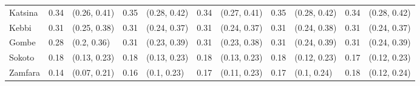 \begin{tabular}{lrlrlrlrlrl}
Katsina & 0.34 & (0.26, 0.41) & 0.35 & (0.28, 0.42) & 0.34 & (0.27, 0.41) & 0.35 & (0.28, 0.42) & 0.34 & (0.28, 0.42)\\
Kebbi & 0.31 & (0.25, 0.38) & 0.31 & (0.24, 0.37) & 0.31 & (0.24, 0.37) & 0.31 & (0.24, 0.38) & 0.31 & (0.24, 0.37)\\
Gombe & 0.28 & (0.2, 0.36) & 0.31 & (0.23, 0.39) & 0.31 & (0.23, 0.38) & 0.31 & (0.24, 0.39) & 0.31 & (0.24, 0.39)\\
Sokoto & 0.18 & (0.13, 0.23) & 0.18 & (0.13, 0.23) & 0.18 & (0.13, 0.23) & 0.18 & (0.12, 0.23) & 0.17 & (0.12, 0.23)\\
Zamfara & 0.14 & (0.07, 0.21) & 0.16 & (0.1, 0.23) & 0.17 & (0.11, 0.23) & 0.17 & (0.1, 0.24) & 0.18 & (0.12, 0.24)\\
\bottomrule
\end{tabular}
